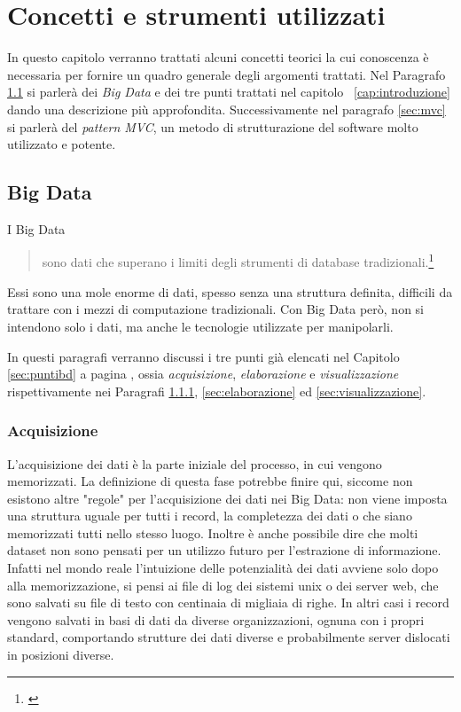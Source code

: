 \chapter{Concetti e strumenti utilizzati}
In questo capitolo verranno trattati alcuni concetti teorici la cui conoscenza è necessaria per fornire un quadro generale degli argomenti trattati. Nel Paragrafo \ref{sec:bigdata} si parlerà dei \emph{Big Data} e dei tre punti trattati nel capitolo~ \ref{cap:introduzione} dando una descrizione più approfondita. Successivamente nel paragrafo \ref{sec:mvc} si parlerà del \emph{pattern MVC}, un metodo di strutturazione del software molto utilizzato e potente.


\section{Big Data}\label{sec:bigdata}
I Big Data
\begin{quote}
sono dati che superano i limiti degli strumenti di database tradizionali.\footnote{\cite{rezzani2013big}}
\end{quote} 
Essi sono una mole enorme di dati, spesso senza una struttura definita, difficili da trattare con i mezzi di computazione tradizionali. Con Big Data però, non si intendono solo i dati, ma anche le tecnologie utilizzate per manipolarli.

In questi paragrafi verranno discussi i tre punti già elencati nel Capitolo \ref{sec:puntibd} a pagina \pageref{sec:puntibd}, ossia \emph{acquisizione}, \emph{elaborazione} e \emph{visualizzazione} rispettivamente nei Paragrafi \ref{sec:acquisizione}, \ref{sec:elaborazione} ed \ref{sec:visualizzazione}.


\subsection{Acquisizione}\label{sec:acquisizione}
L'acquisizione dei dati è la parte iniziale del processo, in cui vengono memorizzati. La definizione di questa fase potrebbe finire qui, siccome non esistono altre "regole" per l'acquisizione dei dati nei Big Data: non viene imposta una struttura uguale per tutti i record, la completezza dei dati o che siano memorizzati tutti nello stesso luogo. Inoltre è anche possibile dire che molti dataset non sono pensati per un utilizzo futuro per l'estrazione di informazione. Infatti nel mondo reale l'intuizione delle potenzialità dei dati avviene solo dopo alla memorizzazione, si pensi ai file di log dei sistemi unix o dei server web, che sono salvati su file di testo con centinaia di migliaia di righe. In altri casi i record vengono salvati in basi di dati da diverse organizzazioni, ognuna con i propri standard, comportando strutture dei dati diverse e probabilmente server dislocati in posizioni diverse.

